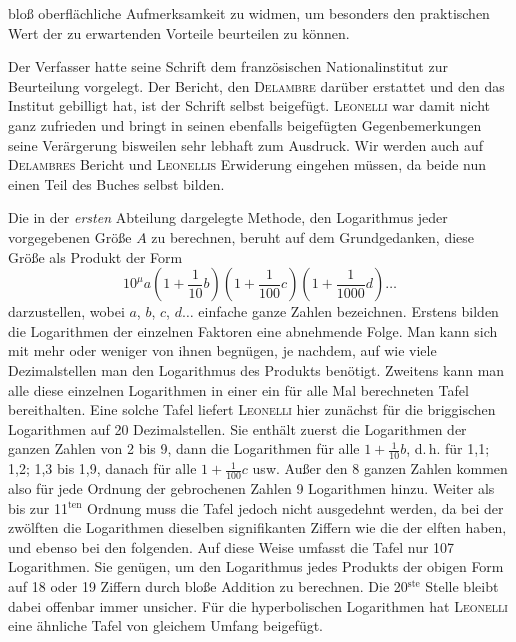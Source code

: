 %
bloß oberflächliche Aufmerksamkeit zu widmen, um besonders den praktischen Wert der zu erwartenden Vorteile beurteilen zu können.

Der Verfasser hatte seine Schrift dem französischen Nationalinstitut zur Beurteilung vorgelegt. Der Bericht, den \textsc{Delambre} darüber erstattet und den das Institut gebilligt hat, ist der Schrift selbst beigefügt. \textsc{Leonelli} war damit nicht ganz zufrieden und bringt in seinen ebenfalls beigefügten Gegenbemerkungen seine Verärgerung bisweilen sehr lebhaft zum Ausdruck. Wir werden auch auf \textsc{Delambres} Bericht und \textsc{Leonellis} Erwiderung eingehen müssen, da beide nun einen Teil des Buches selbst bilden.

Die in der \emph{ersten} Abteilung dargelegte Methode, den Logarithmus jeder vorgegebenen Größe $A$ zu berechnen, beruht auf dem Grundgedanken, diese Größe als Produkt der Form
\[
10^{\mu} a \left(1+\frac{1}{10} b\right)\left(1+\frac{1}{100} c\right)\left(1+\frac{1}{1000} d\right)\ldots
\]
darzustellen, wobei $a$, $b$, $c$, $d\ldots$ einfache ganze Zahlen bezeichnen. Erstens bilden die Logarithmen der einzelnen Faktoren eine abnehmende Folge. Man kann sich mit mehr oder weniger von ihnen begnügen, je nachdem, auf wie viele Dezimalstellen man den Logarithmus des Produkts benötigt. Zweitens kann man alle diese einzelnen Logarithmen in einer ein für alle Mal berechneten Tafel bereithalten. Eine solche Tafel liefert \textsc{Leonelli} hier zunächst für die briggischen Logarithmen auf 20 Dezimalstellen. Sie enthält zuerst die Logarithmen der ganzen Zahlen von 2 bis 9, dann die Logarithmen für alle $1+\frac{1}{10} b$, d.\,h. für 1,1; 1,2; 1,3 bis 1,9, danach für alle $1+\frac{1}{100} c$ usw. Außer den 8 ganzen Zahlen kommen also für jede Ordnung der gebrochenen Zahlen 9 Logarithmen hinzu. Weiter als bis zur 11$^{\mathrm{ten}}$ Ordnung muss die Tafel jedoch nicht ausgedehnt werden, da bei der zwölften die Logarithmen dieselben signifikanten Ziffern wie die der elften haben, und ebenso bei den folgenden. Auf diese Weise umfasst die Tafel nur 107 Logarithmen. Sie genügen, um den Logarithmus jedes Produkts der obigen Form auf 18 oder 19 Ziffern durch bloße Addition zu berechnen. Die 20$^{\mathrm{ste}}$ Stelle bleibt dabei offenbar immer unsicher. Für die hyperbolischen Logarithmen hat \textsc{Leonelli} eine ähnliche Tafel von gleichem Umfang beigefügt.

